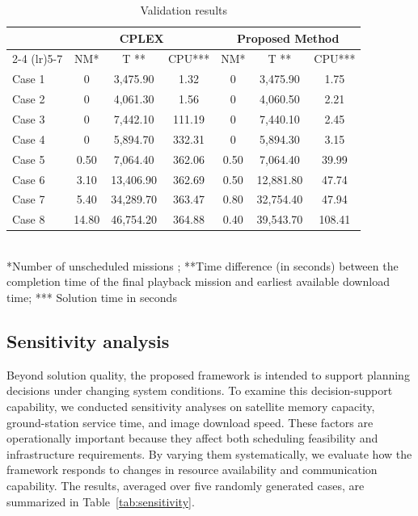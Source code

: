 \documentclass[preprint,3p,12pt,authoryear]{elsarticle}
\begin{document}
\begin{table}[h!]
\caption{Validation results}
\label{tab:validation}
\centering
\begin{tabular}{lcccccc}
\toprule
 & \multicolumn{3}{c}{CPLEX} & \multicolumn{3}{c}{Proposed Method} \\
\cmidrule(lr){2-4} \cmidrule(lr){5-7}
 & NM* & T ** & CPU*** & NM* & T ** & CPU*** \\
\midrule
Case 1 & 0 & 3,475.90 & 1.32 & 0 & 3,475.90 & 1.75 \\
Case 2 & 0 & 4,061.30 & 1.56 & 0 & 4,060.50 & 2.21 \\
Case 3 & 0 & 7,442.10 & 111.19 & 0 & 7,440.10 & 2.45 \\
Case 4 & 0 & 5,894.70 & 332.31 & 0 & 5,894.30 & 3.15 \\
Case 5 & 0.50 & 7,064.40 & 362.06 & 0.50 & 7,064.40 & 39.99 \\
Case 6 & 3.10 & 13,406.90 & 362.69 & 0.50 & 12,881.80 & 47.74 \\
Case 7 & 5.40 & 34,289.70 & 363.47 & 0.80 & 32,754.40 & 47.94 \\
Case 8 & 14.80 & 46,754.20 & 364.88 & 0.40 & 39,543.70 & 108.41 \\
\bottomrule
\end{tabular}
\\
*Number of unscheduled missions ;  
**Time difference (in seconds) between the completion time of the final playback mission and earliest available download time; 
*** Solution time in seconds
\end{table}

\subsection{Sensitivity analysis}
Beyond solution quality, the proposed framework is intended to support planning decisions under changing system conditions. To examine this decision-support capability, we conducted sensitivity analyses on satellite memory capacity, ground-station service time, and image download speed. These factors are operationally important because they affect both scheduling feasibility and infrastructure requirements. By varying them systematically, we evaluate how the framework responds to changes in resource availability and communication capability. The results, averaged over five randomly generated cases, are summarized in Table~\ref{tab:sensitivity}.
\end{document}

